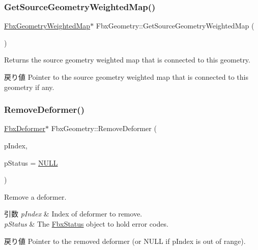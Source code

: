 \subsubsection{\texorpdfstring{Get\+Source\+Geometry\+Weighted\+Map()}{GetSourceGeometryWeightedMap()}}
{\footnotesize\ttfamily \hyperlink{class_fbx_geometry_weighted_map}{Fbx\+Geometry\+Weighted\+Map}$\ast$ Fbx\+Geometry\+::\+Get\+Source\+Geometry\+Weighted\+Map (\begin{DoxyParamCaption}{ }\end{DoxyParamCaption})}

Returns the source geometry weighted map that is connected to this geometry. \begin{DoxyReturn}{戻り値}
Pointer to the source geometry weighted map that is connected to this geometry if any. 
\end{DoxyReturn}
\mbox{\label{class_fbx_geometry_a49e920f4c7a2179ef3297e7c5f2cf31a}} 
\subsubsection{\texorpdfstring{Remove\+Deformer()}{RemoveDeformer()}}
{\footnotesize\ttfamily \hyperlink{class_fbx_deformer}{Fbx\+Deformer}$\ast$ Fbx\+Geometry\+::\+Remove\+Deformer (\begin{DoxyParamCaption}\item[{int}]{p\+Index,  }\item[{\hyperlink{class_fbx_status}{Fbx\+Status} $\ast$}]{p\+Status = {\ttfamily \hyperlink{fbxarch_8h_a070d2ce7b6bb7e5c05602aa8c308d0c4}{N\+U\+LL}} }\end{DoxyParamCaption})}

Remove a deformer. 
\begin{DoxyParams}{引数}
{\em p\+Index} & Index of deformer to remove. \\
\hline
{\em p\+Status} & The \hyperlink{class_fbx_status}{Fbx\+Status} object to hold error codes. \\
\hline
\end{DoxyParams}
\begin{DoxyReturn}{戻り値}
Pointer to the removed deformer (or {\ttfamily N\+U\+LL} if p\+Index is out of range). 
\end{DoxyReturn}
\mbox{\label{class_fbx_geometry_a891f23fed585b15503cdf8a38b424e14}} 
